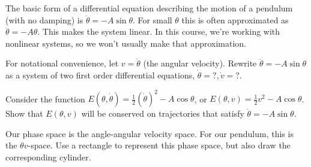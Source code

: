 \documentclass[12pt,letterpaper,noanswers]{exam}
\begin{document}
\begin{questions}
\item The basic form of a differential equation describing the motion of a pendulum (with no damping) is $\displaystyle\ddot{\theta} = -A \sin \theta$.  For small $\theta$ this is often approximated as $\displaystyle\ddot{\theta} = -A\theta$.  This makes the system linear.  In this course, we're working with nonlinear systems, so we won't usually make that approximation.

\begin{parts}
\item For notational convenience, let $v = \dot{\theta}$ (the angular velocity).  Rewrite $\displaystyle\ddot{\theta} = - A \sin \theta$ as a system of two first order differential equations, $\dot{\theta} = ?, \dot{v} = ?$.
\item Consider the function $E(\theta,\dot{\theta}) = \frac{1}{2}(\dot{\theta})^2 - A \cos\theta$, or $E(\theta,v) = \frac{1}{2}v^2 - A \cos\theta$.  Show that $E(\theta,v)$ will be conserved on trajectories that satisfy $\displaystyle\ddot{\theta} = -A \sin \theta$.



\item Our phase space is the angle-angular velocity space.  For our pendulum, this is the $\theta v$-space.  Use a rectangle to represent this phase space, but also draw the corresponding cylinder.


\end{parts}
\end{questions}
\end{document}
